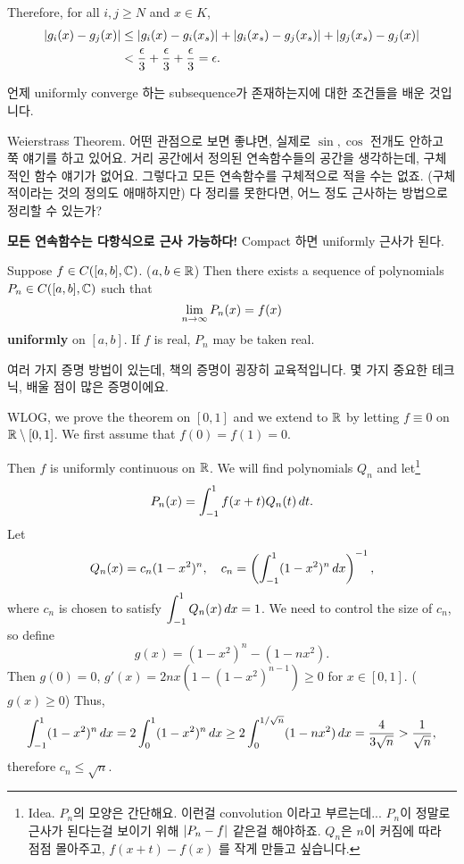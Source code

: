 Therefore, for all \(i, j \geq N\) and \(x \in K\),
\[
    \begin{aligned}
        \left| g_i(x) - g_j(x) \right| & \leq \left| g_i(x) - g_i(x_s) \right| + \left| g_i(x_s) - g_j(x_s) \right| + \left| g_j(x_s) - g_j(x) \right| \\
                              & < \frac{\epsilon}{3} + \frac{\epsilon}{3} + \frac{\epsilon}{3} = \epsilon.
    \end{aligned}
\]

언제 uniformly converge 하는 subsequence가 존재하는지에 대한 조건들을 배운 것입니다.

Weierstrass Theorem. 어떤 관점으로 보면 좋냐면, 실제로 \(\sin, \cos\) 전개도 안하고 쭉 얘기를 하고 있어요. 거리 공간에서 정의된 연속함수들의 공간을 생각하는데, 구체적인 함수 얘기가 없어요. 그렇다고 모든 연속함수를 구체적으로 적을 수는 없죠. (구체적이라는 것의 정의도 애매하지만) 다 정리를 못한다면, 어느 정도 근사하는 방법으로 정리할 수 있는가?

\textbf{모든 연속함수는 다항식으로 근사 가능하다!} Compact 하면 uniformly 근사가 된다.

  Suppose \(f \in C([a, b], \mathbb{C})\). (\(a, b\in \mathbb{R}\)) Then there exists a sequence of polynomials \(P_n \in C([a, b], \mathbb{C})\) such that
\[
    \lim_{n \rightarrow \infty} P_n(x) = f(x)
\]
\textbf{uniformly} on \([a, b]\). If \(f\) is real, \(P_n\) may be taken real.

여러 가지 증명 방법이 있는데, 책의 증명이 굉장히 교육적입니다. 몇 가지 중요한 테크닉, 배울 점이 많은 증명이에요.

\pf WLOG, we prove the theorem on \([0, 1]\) and we extend to \(\mathbb{R}\) by letting \(f \equiv 0\) on \(\mathbb{R} \setminus [0, 1]\). We first assume that \(f(0) = f(1) = 0\).

Then \(f\) is uniformly continuous on \(\mathbb{R}\). We will find polynomials \(Q_n\) and let\footnote{Idea. \(P_n\)의 모양은 간단해요. 이런걸 convolution 이라고 부르는데... \(P_n\)이 정말로 근사가 된다는걸 보이기 위해 \(\left| P_n - f \right|\) 같은걸 해야하죠. \(Q_n\)은 \(n\)이 커짐에 따라 점점 몰아주고, \(f(x + t) - f(x)\) 를 작게 만들고 싶습니다.}
\[
    P_n(x) = \int_{-1}^1 f(x+t) Q_n(t) \,d{t}.
\]
Let
\[
    Q_n(x) = c_n(1-x^2)^n, \quad c_n = \left(\int_{-1}^1 (1-x^2)^n \,d{x}\right)^{-1},
\]
where \(c_n\) is chosen to satisfy \(\displaystyle \int_{-1}^1 Q_n(x) \,d{x} = 1\). We need to control the size of \(c_n\), so define
\[
    g(x) = (1-x^2)^n - (1-nx^2).
\]
Then \(g(0) = 0\), \(g'(x) = 2nx(1 - (1-x^2)^{n-1})\geq 0\) for \(x \in [0, 1]\). (\(g(x) \geq 0\)) Thus,
\[
    \int_{-1}^1 (1-x^2)^n \,d{x} = 2\int_0^1 (1-x^2)^n \,d{x} \geq 2 \int_0^{1/\sqrt{n}} (1 - nx^2) \,d{x} = \frac{4}{3\sqrt{n}} > \frac{1}{\sqrt{n}},
\]
therefore \(c_n \leq \sqrt{n}\).

